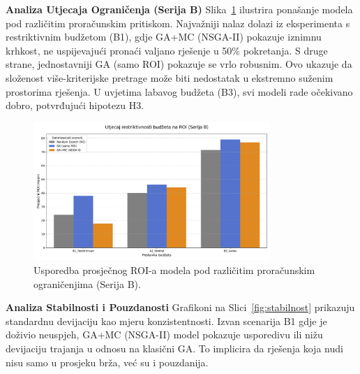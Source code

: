 \textbf{Analiza Utjecaja Ograničenja (Serija B)}
Slika~\ref{fig:budzet_roi} ilustrira ponašanje modela pod različitim proračunskim pritiskom. Najvažniji nalaz dolazi iz eksperimenta s restriktivnim budžetom (B1), gdje GA+MC (NSGA-II) pokazuje iznimnu krhkost, ne uspijevajući pronaći valjano rješenje u 50\% pokretanja. S druge strane, jednostavniji GA (samo ROI) pokazuje se vrlo robusnim. Ovo ukazuje da složenost više-kriterijske pretrage može biti nedostatak u ekstremno suženim prostorima rješenja. U uvjetima labavog budžeta (B3), svi modeli rade očekivano dobro, potvrđujući hipotezu H3.

\begin{figure}[H]
    \centering
    \includegraphics[width=0.8\textwidth]{slike/grafikoni_final/B_budzet_roi.png}
    \caption{Usporedba prosječnog ROI-a modela pod različitim proračunskim ograničenjima (Serija B).}
    \label{fig:budzet_roi}
\end{figure}

\textbf{Analiza Stabilnosti i Pouzdanosti}
Grafikoni na Slici~\ref{fig:stabilnost} prikazuju standardnu devijaciju kao mjeru konzistentnosti. Izvan scenarija B1 gdje je doživio neuspjeh, GA+MC (NSGA-II) model pokazuje usporedivu ili nižu devijaciju trajanja u odnosu na klasični GA. To implicira da rješenja koja nudi nisu samo u prosjeku brža, već su i pouzdanija.


